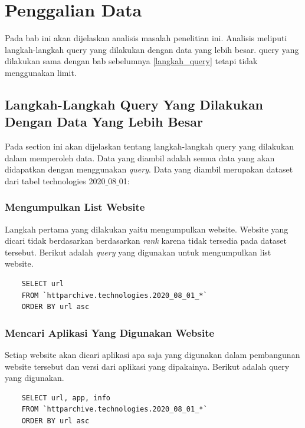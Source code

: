 \chapter{Penggalian Data}
\label{chap:penggalian data}
Pada bab ini akan dijelaskan analisis masalah penelitian ini. Analisis meliputi langkah-langkah query yang dilakukan dengan data yang lebih besar. query yang dilakukan sama dengan bab sebelumnya \ref{langkah_query} tetapi tidak menggunakan limit.

\section{Langkah-Langkah Query Yang Dilakukan Dengan Data Yang Lebih Besar}
Pada section ini akan dijelaskan tentang langkah-langkah query yang dilakukan dalam memperoleh data. Data yang diambil adalah semua data yang akan didapatkan dengan menggunakan \textit{query}. Data yang diambil merupakan dataset dari tabel technologies 2020$\_$08$\_$01:

\subsection{Mengumpulkan List Website}
Langkah pertama yang dilakukan yaitu mengumpulkan website. Website yang dicari tidak berdasarkan berdasarkan \textit{rank} karena tidak tersedia pada dataset tersebut. Berikut adalah \textit{query} yang digunakan untuk mengumpulkan list website.
\begin{lstlisting}
	SELECT url
	FROM `httparchive.technologies.2020_08_01_*`
	ORDER BY url asc
\end{lstlisting}

\subsection{Mencari Aplikasi Yang Digunakan Website}
Setiap website akan dicari aplikasi apa saja yang digunakan dalam pembangunan website tersebut dan versi dari aplikasi yang dipakainya. Berikut adalah query yang digunakan.
\begin{lstlisting}
	SELECT url, app, info
	FROM `httparchive.technologies.2020_08_01_*`
	ORDER BY url asc
\end{lstlisting}

